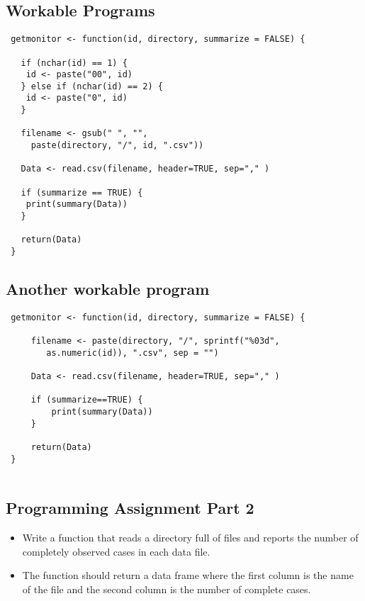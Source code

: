 \documentclass[]{article}
\begin{document}
\subsection{Workable Programs}
\begin{framed}
\begin{verbatim}
 getmonitor <- function(id, directory, summarize = FALSE) {
 
   if (nchar(id) == 1) {
   	id <- paste("00", id)
   } else if (nchar(id) == 2) {
   	id <- paste("0", id)
   }
 
   filename <- gsub(" ", "", 
     paste(directory, "/", id, ".csv"))
   
   Data <- read.csv(filename, header=TRUE, sep="," )
 
   if (summarize == TRUE) {
   	print(summary(Data))
   }
 
   return(Data)
 }
  \end{verbatim}
 \end{framed}
 \newpage
\subsection{ Another workable program}
 \begin{framed}
 \begin{verbatim}
 getmonitor <- function(id, directory, summarize = FALSE) {
 
     filename <- paste(directory, "/", sprintf("%03d", 
        as.numeric(id)), ".csv", sep = "")
 
     Data <- read.csv(filename, header=TRUE, sep="," )
 
     if (summarize==TRUE) {
         print(summary(Data))
     }
 
     return(Data)
 }
 
 \end{verbatim}
  \end{framed}
\newpage


\subsection{Programming Assignment Part 2}
\begin{itemize}
\item Write a function that reads a directory full of files and reports the number of completely observed cases in each data file. \item The function should return a data frame where the first column is the name of the file and the second column is the number of complete cases.
\end{itemize}
\end{document}
